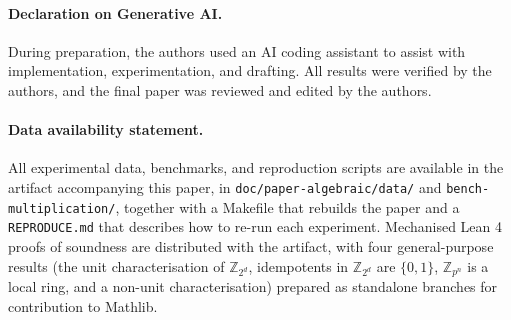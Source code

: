 \documentclass[runningheads]{llncs}
\begin{document}
\paragraph{Declaration on Generative AI.}
During preparation, the authors used an AI coding assistant to
assist with implementation, experimentation, and drafting. All
results were verified by the authors, and the final paper was
reviewed and edited by the authors.

\paragraph{Data availability statement.}
All experimental data, benchmarks, and reproduction scripts are
available in the artifact accompanying this paper, in
\texttt{doc/paper-algebraic/data/} and
\texttt{bench-multiplication/}, together with a Makefile that
rebuilds the paper and a \texttt{REPRODUCE.md} that describes how
to re-run each experiment. Mechanised Lean 4 proofs of soundness
are distributed with the artifact, with four general-purpose
results (the unit characterisation of $\mathbb{Z}_{2^d}$,
idempotents in $\mathbb{Z}_{2^d}$ are $\{0, 1\}$,
$\mathbb{Z}_{p^n}$ is a local ring, and a non-unit
characterisation) prepared as standalone branches for
contribution to Mathlib.



\end{document}
